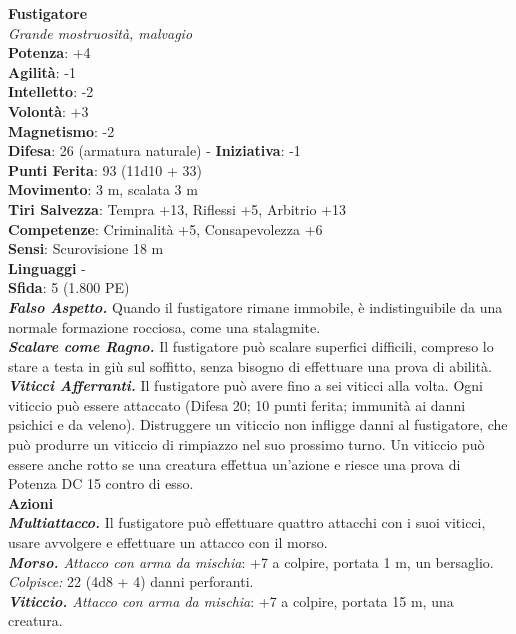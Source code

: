 \begin{multicols}{2}
\medskip\textbf{Fustigatore}\\
\emph{Grande mostruosità, malvagio}\\
\textbf{Potenza}: +4\\
\textbf{Agilità}: -1\\
\textbf{Intelletto}: -2\\
\textbf{Volontà}: +3\\
\textbf{Magnetismo}: -2\\
\textbf{Difesa}: 26 (armatura naturale) - \textbf{Iniziativa}: -1\\
\textbf{Punti Ferita}: 93 (11d10 + 33)\\
\textbf{Movimento}: 3 m, scalata 3 m\\
\textbf{Tiri Salvezza}: Tempra +13, Riflessi +5, Arbitrio +13\\
\textbf{Competenze}: Criminalità +5, Consapevolezza +6\\
\textbf{Sensi}: Scurovisione 18 m\\
\textbf{Linguaggi} -\\
\textbf{Sfida}: 5 (1.800 PE)\smallskip\\
\emph{\textbf{Falso Aspetto.}} Quando il fustigatore rimane immobile, è indistinguibile da una normale formazione rocciosa, come una stalagmite.\\
\emph{\textbf{Scalare come Ragno.}} Il fustigatore può scalare superfici difficili, compreso lo stare a testa in giù sul soffitto, senza bisogno di effettuare una prova di abilità.\\
\emph{\textbf{Viticci Afferranti.}} Il fustigatore può avere fino a sei viticci alla volta. Ogni viticcio può essere attaccato (Difesa 20; 10 punti ferita; immunità ai danni psichici e da veleno). Distruggere un viticcio non infligge danni al fustigatore, che può produrre un viticcio di rimpiazzo nel suo prossimo turno. Un viticcio può essere anche rotto se una creatura effettua un'azione e riesce una prova di Potenza DC 15 contro di esso.\\
\smallskip\textbf{Azioni}\\
\emph{\textbf{Multiattacco.}} Il fustigatore può effettuare quattro attacchi con i suoi viticci, usare avvolgere e effettuare un attacco con il morso.\\
\emph{\textbf{Morso.} Attacco con arma da mischia}: +7 a colpire, portata 1 m, un bersaglio.\\
\emph{Colpisce:} 22 (4d8 + 4) danni perforanti.\\
\emph{\textbf{Viticcio.} Attacco con arma da mischia}: +7 a colpire, portata 15 m, una creatura.\\

\end{multicols}
